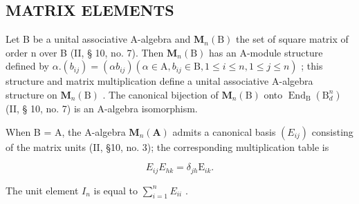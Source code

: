 \subsection{MATRIX ELEMENTS}

Let B be a unital associative A-algebra and \(\mathbf{M}_{n}(\mathrm{B})\) the set of square matrix of order n over B (II, § 10, no. 7). Then \(\mathbf{M}_{n}(\mathrm{B})\) has an A-module structure defined by \(\alpha.(b_{ij})=(\alpha b_{ij})(\alpha\in\mathrm{A},b_{ij}\in\mathrm{B},1\leqslant i\leqslant n,1\leqslant j\leqslant n)\) ; this structure and matrix multiplication define a unital associative A-algebra structure on \(\mathbf{M}_{n}(\mathrm{B})\) . The canonical bijection of \(\mathbf{M}_{n}(\mathrm{B})\) onto \(\operatorname{End}_{\mathrm{B}}(\mathrm{B}_{d}^{n})\) (II, § 10, no. 7) is an A-algebra isomorphism.

When B = A, the A-algebra \(\mathbf{M}_{n}(\mathbf{A})\) admits a canonical basis \((E_{ij})\) consisting of the matrix units (II, §10, no. 3); the corresponding multiplication table is

\[
E _ {i j} E _ {h k} = \delta_ {j h} \mathrm{E} _ {i k}.\tag{1}
\]

The unit element \(I_{n}\) is equal to \(\sum_{i=1}^{n} E_{ii}\) .

